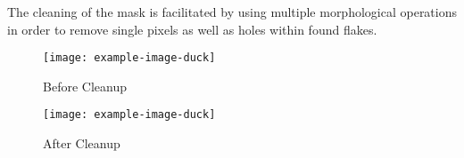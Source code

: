 The cleaning of the mask is facilitated by using multiple morphological operations in order to remove single pixels as well as holes within found flakes.\\
\begin{figure}[h]
\centering
\begin{minipage}{.45\textwidth}
  \centering
  \texttt{[image: example-image-duck]}
  \caption{Before Cleanup}
\end{minipage}
\begin{minipage}{.45\textwidth}
  \centering
  \texttt{[image: example-image-duck]}
    \caption{After Cleanup}
\end{minipage}
\end{figure}